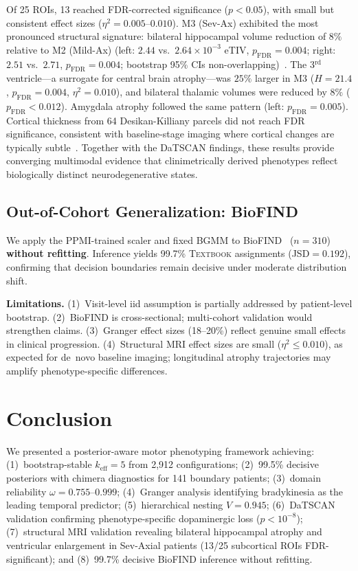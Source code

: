 \documentclass[runningheads]{llncs}
\begin{document}
Of 25 ROIs, 13 reached FDR-corrected significance ($p{<}0.05$), with small but consistent effect sizes ($\eta^2{=}0.005$--$0.010$). M3 (Sev-Ax) exhibited the most pronounced structural signature: bilateral hippocampal volume reduction of $8\%$ relative to M2 (Mild-Ax) (left: $2.44$ vs.\ $2.64{\times}10^{-3}$ eTIV, $p_{\mathrm{FDR}}{=}0.004$; right: $2.51$ vs.\ $2.71$, $p_{\mathrm{FDR}}{=}0.004$; bootstrap 95\% CIs non-overlapping)~\cite{qian2025cortical}. The 3$^{\mathrm{rd}}$ ventricle---a surrogate for central brain atrophy---was $25\%$ larger in M3 ($H{=}21.4$, $p_{\mathrm{FDR}}{=}0.004$, $\eta^2{=}0.010$), and bilateral thalamic volumes were reduced by $8\%$ ($p_{\mathrm{FDR}}{<}0.012$). Amygdala atrophy followed the same pattern (left: $p_{\mathrm{FDR}}{=}0.005$). Cortical thickness from 64 Desikan-Killiany parcels did not reach FDR significance, consistent with baseline-stage imaging where cortical changes are typically subtle~\cite{pereira2024cortical}. Together with the DaTSCAN findings, these results provide converging multimodal evidence that clinimetrically derived phenotypes reflect biologically distinct neurodegenerative states.

\subsection{Out-of-Cohort Generalization: BioFIND}

We apply the PPMI-trained scaler and fixed BGMM to BioFIND~\cite{biofind2015} ($n{=}310$) \textbf{without refitting}. Inference yields 99.7\% \textsc{Textbook} assignments (JSD${=}0.192$), confirming that decision boundaries remain decisive under moderate distribution shift.

\textbf{Limitations.} (1)~Visit-level iid assumption is partially addressed by patient-level bootstrap. (2)~BioFIND is cross-sectional; multi-cohort validation would strengthen claims. (3)~Granger effect sizes (18--20\%) reflect genuine small effects in clinical progression. (4)~Structural MRI effect sizes are small ($\eta^2{\leq}0.010$), as expected for de~novo baseline imaging; longitudinal atrophy trajectories may amplify phenotype-specific differences.

\section{Conclusion}

We presented a posterior-aware motor phenotyping framework achieving: (1)~bootstrap-stable $k_{\mathrm{eff}}{=}5$ from 2{,}912 configurations; (2)~99.5\% decisive posteriors with chimera diagnostics for 141 boundary patients; (3)~domain reliability $\omega{=}0.755$--$0.999$; (4)~Granger analysis identifying bradykinesia as the leading temporal predictor; (5)~hierarchical nesting $V{=}0.945$; (6)~DaTSCAN validation confirming phenotype-specific dopaminergic loss ($p{<}10^{-8}$); (7)~structural MRI validation revealing bilateral hippocampal atrophy and ventricular enlargement in Sev-Axial patients (13/25 subcortical ROIs FDR-significant); and (8)~99.7\% decisive BioFIND inference without refitting.
\end{document}
